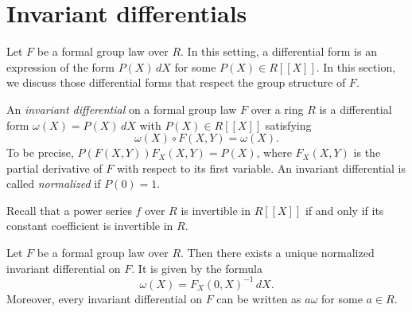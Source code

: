 \section{Invariant differentials}

Let $F$ be a formal group law over $R$. In this setting, a differential form is an expression
of the form
$P(X) \, dX$ for some $P(X) \in R[\![X]\!]$. In this section, we discuss those
differential forms that respect the group structure of $F$.

\begin{definition}
    An \emph{invariant differential} on a formal group law $F$ over a ring $R$ is a differential form
    $\omega (X) = P(X)\, dX$ with $P(X) \in R[\![X]\!]$ satisfying
    \[\omega(X) \circ F(X,Y) = \omega (X).\]
    To be precise, $P(F(X,Y)) F_X (X,Y) = P(X)$, where $F_X(X,Y)$ is the partial derivative of
    $F$ with respect to its first variable. An invariant differential is called \emph{normalized}
    if $P(0) = 1$.
\end{definition}

Recall that a power series $f$ over $R$ is invertible in $R[\![X]\!]$
if and only if its constant coefficient is invertible in $R$.

\begin{proposition}
    Let $F$ be a formal group law over $R$. Then there exists a unique normalized invariant
    differential on $F$. It is given by the formula
    \[ \omega (X) = F_X (0,X) ^ {-1} \, dX. \]
    Moreover, every invariant differential on $F$ can be written as $a \omega$ for some $a \in R$.
\end{proposition}

